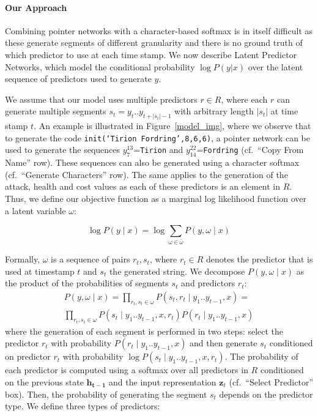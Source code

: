 \documentclass[11pt]{article}
\begin{document}
\paragraph{Our Approach} Combining pointer networks with a character-based softmax is in itself difficult as these generate segments of different granularity and there is no ground truth of which predictor to use at each time stamp.
We now describe Latent Predictor Networks, which model the conditional probability $\log P(y | x)$ over the latent sequence of predictors used to generate $y$.

We assume that our model uses multiple predictors $r\in R$, where each $r$
can generate multiple segments $s_t=y_t..y_{t+|s_t|-1}$ with arbitrary length $|s_t|$ at
time stamp $t$. An example is illustrated in Figure~\ref{model_img}, where we
observe that to generate the code \texttt{init(`Tirion Fordring',8,6,6)}, a
pointer network can be used to generate the sequences $y_7^{13}$=\texttt{Tirion} and
$y_{14}^{22}$=\texttt{Fordring} (cf.~``Copy From Name'' row). These sequences can also be
generated using a character softmax (cf.~``Generate Characters'' row). The same
applies to the generation of the attack, health and cost values as each of these
predictors is an element in $R$. Thus, we define our objective function as a
marginal log likelihood function over a latent variable $\omega$:

\begin{equation}
\label{marginal}
\log P(y \mid x) = \log \sum_{\omega \in \bar{\omega}} P(y, \omega \mid x)
\end{equation}

Formally, $\omega$ is a sequence of pairs $r_t,s_t$, where $r_t\in R$ denotes
the predictor that is used at time\-stamp $t$ and $s_t$ the
generated string. We decompose $P(y,
\omega \mid x)$ as the product of the probabilities of segments $s_t$ and
predictors $r_t$:
\begin{align*}
\nonumber P(y, \omega \mid x) = \prod_{r_t,s_t \in \omega} P(s_t, r_t \mid y_1..y_{t-1}, x) = \\
\prod_{r_t,s_t \in \omega} P(s_t \mid y_1..y_{t-1}, x, r_t) P(r_t \mid y_1..y_{t-1}, x)
\end{align*}
where the generation of each segment is performed in two steps: select the
predictor $r_t$ with probability $P(r_t \mid y_1..y_{t-1}, x)$ and then generate
$s_t$ conditioned on predictor $r_t$ with probability $\log P(s_t \mid y_1..y_{t-1}, x,
r_t)$. The probability of each predictor is computed using a softmax over all
predictors in $R$ conditioned on the previous state $\mathbf{h_{t-1}}$ and the
input representation $\mathbf{z}_t$ (cf.~``Select Predictor'' box). Then, the
probability of generating the segment $s_t$ depends on the predictor type.
We define three types of predictors:
\end{document}
